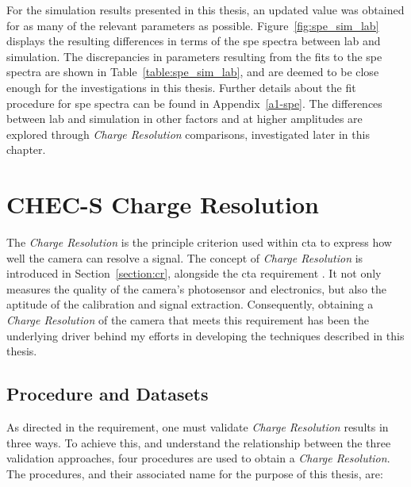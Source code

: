 For the simulation results presented in this thesis, an updated value was obtained for as many of the relevant  parameters as possible. Figure~\ref{fig:spe_sim_lab} displays the resulting differences in terms of the \gls{spe} spectra between lab and simulation. The discrepancies in parameters resulting from the fits to the \gls{spe} spectra are shown in Table~\ref{table:spe_sim_lab}, and are deemed to be close enough for the investigations in this thesis. Further details about the fit procedure for \gls{spe} spectra can be found in Appendix~\ref{a1-spe}. The differences between lab and simulation in other factors and at higher amplitudes are explored through \textit{Charge Resolution} comparisons, investigated later in this chapter.

\section{CHEC-S Charge Resolution}

The \textit{Charge Resolution} is the principle criterion used within \gls{cta} to express how well the camera can resolve a signal. The concept of \textit{Charge Resolution} is introduced in Section~\ref{section:cr}, alongside the \gls{cta} requirement . It not only measures the quality of the camera's photosensor and electronics, but also the aptitude of the calibration and signal extraction. Consequently, obtaining a \textit{Charge Resolution} of the camera that meets this requirement has been the underlying driver behind my efforts in developing the techniques described in this thesis.

\subsection{Procedure and Datasets}

As directed in the  requirement, one must validate \textit{Charge Resolution} results in three ways. To achieve this, and understand the relationship between the three validation approaches, four procedures are used to obtain a \textit{Charge Resolution}. The procedures, and their associated name for the purpose of this thesis, are:


